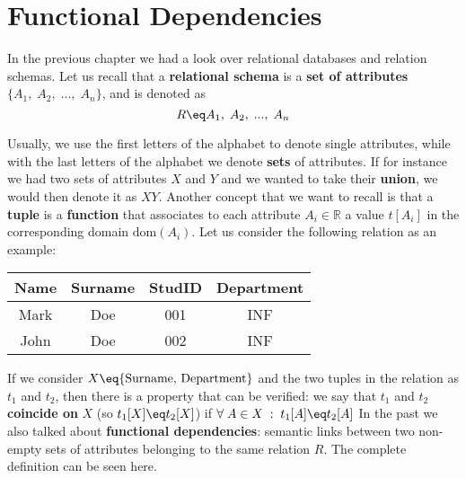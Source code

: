 \chapter{Functional Dependencies}

In the previous chapter we had a look over relational databases and relation schemas. Let us recall that a \textbf{relational schema} is a \textbf{set of attributes} $\{ A_1, \; A_2, \; ..., \; A_n \}$, and is denoted as
\[ R \eq A_1, \; A_2, \; ..., \; A_n \]

Usually, we use the first letters of the alphabet to denote single attributes, while with the last letters of the alphabet we denote \textbf{sets} of attributes. If for instance we had two sets of attributes $X$ and $Y$ and we wanted to take their \textbf{union}, we would then denote it as $XY$. Another concept that we want to recall is that a \textbf{tuple} is a \textbf{function} that associates to each attribute $A_i \in \mathbb{R}$ a value $t[A_i]$ in the corresponding domain $\text{dom}(A_i)$. Let us consider the following relation as an example:

\begin{center}
    \begin{tabular}{|c|c|c|c|}
        \rowcolor{maindoccol!60} \hline
        \textbf{Name} & \textbf{Surname} & \textbf{StudID} & \textbf{Department} \\
        \hline
        Mark & Doe & 001 & INF \\
        \hline
        John & Doe & 002 & INF \\
        \hline
    \end{tabular}
\end{center}
    
If we consider $X \eq \{\text{Surname, Department}\}$ and the two tuples in the relation as $t_1$ and $t_2$, then there is a property that can be verified: we say that $t_1$ and $t_2$ \textbf{coincide on} $X$ (so $t_1[X] \eq t_2[X]$) if $\forall \; A \in X \; : \; t_1[A] \eq t_2[A]$
\nwl
In the past we also talked about \textbf{functional dependencies}: semantic links between two non-empty sets of attributes belonging to the same relation $R$. The complete definition can be seen here.

